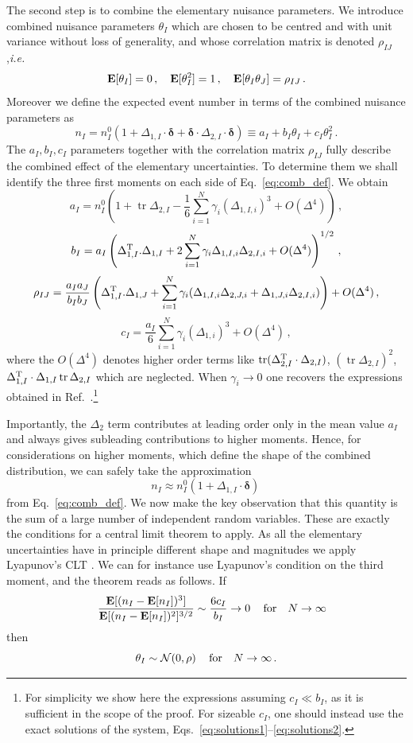\documentclass[11pt]{article}
\def\ie{{\it i.e.}}
\newcommand{\be}{\begin{equation}}
\newcommand{\ee}{\end{equation}}
\newcommand{\tr}{\operatorname{tr}}
\begin{document}
The second step is to combine the elementary nuisance parameters. We introduce combined nuisance parameters $\theta_I$ which  are chosen to be centred and with unit variance without loss of generality, and whose correlation matrix  is denoted $\rho_{IJ}$,\ie
\be
 {\bf E}[\theta_I]=0\,, \quad{\bf E}[\theta^2_I]=1\,,\quad{\bf E}[\theta_I \theta_J]=\rho_{IJ}\,.
\ee
Moreover we define the expected event number in terms of the combined nuisance parameters as
\be
n_I=n^{0}_{I}(1+\Delta_{1,I}\cdot\boldsymbol{\delta}+\boldsymbol{\delta}\cdot\Delta_{2,I}\cdot\boldsymbol{\delta}) \equiv
a_I+b_{I}\theta_I+ c_I\theta_I^2 \label{eq:comb_def}\,.
\ee
The $a_I, b_I, c_I$ parameters together with  the correlation matrix $\rho_{IJ}$ fully describe the combined effect of the elementary uncertainties.
%
To determine them we shall identify the three first moments on each side of Eq.~\eqref{eq:comb_def}. We obtain
 \be
a_{I}=n^{0}_{I}\left(
1+\tr \Delta_{2,I}-\frac{1}{6}\sum_{i=1}^N \gamma_i(\Delta_{1,I,i})^3+O(\Delta^4) \right) \label{eq:n_comb}
\,,
\ee
\be
b_I=a_I\left(\Delta_{1,I}^{\rm T}.\Delta_{1,I}  +2\sum_{i=1}^N \gamma_i\Delta_{1,I,i}\Delta_{2,I,i}+O(\Delta^4)\right)^{1/2}\,,
\ee
\be
\rho_{IJ}= \frac{a_I a_J}{b_I b_J}\left(\Delta_{1,I}^{\rm T}.\Delta_{1,J}  +\sum_{i=1}^N \gamma_i(\Delta_{1,I,i}\Delta_{2,J,i}+\Delta_{1,J,i}\Delta_{2,I,i})\right)+O(\Delta^4)
\,,
\ee
\be
c_I=\frac{a_I}{6}\sum_{i=1}^N \gamma_i(\Delta_{1,i})^3+O(\Delta^4) \label{eq:gam_comb}\,,
\ee
where the $O(\Delta^4)$ denotes higher order terms like $\tr(\Delta_{2,I}^{\rm T}\cdot\Delta_{2,I})$, $(\tr\Delta_{2,I})^2$, $\Delta_{1,I}^{\rm T}\cdot\Delta_{1,I}\tr\Delta_{2,I}$ which are neglected.
When $\gamma_i\rightarrow 0$  one recovers the expressions obtained in Ref.~\cite{Fichet:2016gvx}.\footnote{For simplicity we show here the expressions assuming $c_I\ll b_I$, as it is sufficient in the scope of the proof. For sizeable $c_I$, one should instead use the exact solutions of the system, Eqs.~\eqref{eq:solutions1}--\eqref{eq:solutions2}.}


Importantly, the $\Delta_2$ term contributes at leading order only in the mean value $a_I$ and always gives 
subleading contributions to higher moments. Hence, for considerations on higher moments, which define the  
shape of the combined distribution, we can safely take the approximation
\be
n_{I}\approx n^{0}_{I}\left(1+ \Delta_{1,I}\cdot \boldsymbol{\delta}\right)\, \label{eq:n_approx}
\ee
from Eq.~\eqref{eq:comb_def}.
We now make  the key observation that this quantity is the sum of a large number of independent random variables. These are exactly the conditions for a central limit theorem to apply.
As all the elementary uncertainties have in principle different shape and magnitudes we apply Lyapunov's CLT \cite{Billingsley}. We can for instance use Lyapunov's condition on the third moment, and the theorem reads as follows. If 
\be
\quad\frac{{\bf E}[(n_I-{\bf E}[n_I])^3]}{{\bf E}[(n_I-{\bf E}[n_I])^2]^{3/2}}\sim\frac{6 c_I}{b_I}\rightarrow 0 \quad \,\textrm{for} \quad N\rightarrow \infty
\ee
then
\be
\theta_I\sim {\cal N }(0,\rho) \quad \,\textrm{for} \quad N\rightarrow \infty \,.
\ee
\end{document}
